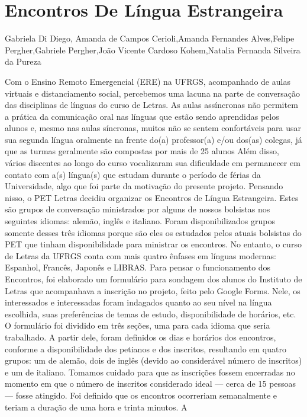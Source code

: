 \section*{Encontros De Língua Estrangeira}

Gabriela Di Diego, Amanda de Campos Cerioli,Amanda Fernandes Alves,Felipe Pergher,Gabriele Pergher,João Vicente Cardoso Kohem,Natalia Fernanda Silveira da Pureza

Com o Ensino Remoto Emergencial (ERE) na UFRGS, acompanhado de aulas virtuais e
distanciamento social, percebemos uma lacuna na parte de conversação das disciplinas de
línguas do curso de Letras. As aulas assíncronas não permitem a prática da comunicação oral nas
línguas que estão sendo aprendidas pelos alunos e, mesmo nas aulas síncronas, muitos não se
sentem confortáveis para usar sua segunda língua oralmente na frente do(a) professor(a) e/ou
dos(as) colegas, já que as turmas geralmente são compostas por mais de 25 alunos Além disso,
vários discentes ao longo do curso vocalizaram sua dificuldade em permanecer em contato com
a(s) língua(s) que estudam durante o período de férias da Universidade, algo que foi parte da
motivação do presente projeto.
Pensando nisso, o PET Letras decidiu organizar os Encontros de Língua Estrangeira. Estes
são grupos de conversação ministrados por alguns de nossos bolsistas nos seguintes idiomas:
alemão, inglês e italiano. Foram disponibilizados grupos somente desses três idiomas porque são
eles os estudados pelos atuais bolsistas do PET que tinham disponibilidade para ministrar os
encontros. No entanto, o curso de Letras da UFRGS conta com mais quatro ênfases em línguas
modernas: Espanhol, Francês, Japonês e LIBRAS.
Para pensar o funcionamento dos Encontros, foi elaborado um formulário para sondagem dos
alunos do Instituto de Letras que acompanhava a inscrição no projeto, feito pelo Google Forms.
Nele, os interessados e interessadas foram indagados quanto ao seu nível na língua escolhida,
suas preferências de temas de estudo, disponibilidade de horários, etc. O formulário foi dividido
em três seções, uma para cada idioma que seria trabalhado. A partir dele, foram definidos os dias
e horários dos encontros, conforme a disponibilidade dos petianos e dos inscritos, resultando em
quatro grupos: um de alemão, dois de inglês (devido ao considerável número de inscritos) e um
de italiano. Tomamos cuidado para que as inscrições fossem encerradas no momento em que o
número de inscritos considerado ideal — cerca de 15 pessoas — fosse atingido. Foi definido que
os encontros ocorreriam semanalmente e teriam a duração de uma hora e trinta minutos. A
